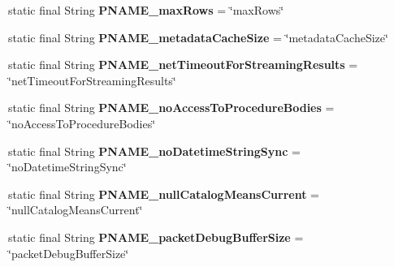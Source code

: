 \begin{DoxyCompactItemize}
\item 
\mbox{\label{classcom_1_1mysql_1_1cj_1_1conf_1_1_property_definitions_a490f08f3dee8039a62123c57b64488b5}} 
static final String {\bfseries P\+N\+A\+M\+E\+\_\+max\+Rows} = \char`\"{}max\+Rows\char`\"{}
\item 
\mbox{\label{classcom_1_1mysql_1_1cj_1_1conf_1_1_property_definitions_a5113a5969f5ac60dffa06189e5e741d9}} 
static final String {\bfseries P\+N\+A\+M\+E\+\_\+metadata\+Cache\+Size} = \char`\"{}metadata\+Cache\+Size\char`\"{}
\item 
\mbox{\label{classcom_1_1mysql_1_1cj_1_1conf_1_1_property_definitions_a6e3ce12814920666c6e75dcf8c844544}} 
static final String {\bfseries P\+N\+A\+M\+E\+\_\+net\+Timeout\+For\+Streaming\+Results} = \char`\"{}net\+Timeout\+For\+Streaming\+Results\char`\"{}
\item 
\mbox{\label{classcom_1_1mysql_1_1cj_1_1conf_1_1_property_definitions_a4b15a5d4e30785901513b2cae7f7b25c}} 
static final String {\bfseries P\+N\+A\+M\+E\+\_\+no\+Access\+To\+Procedure\+Bodies} = \char`\"{}no\+Access\+To\+Procedure\+Bodies\char`\"{}
\item 
\mbox{\label{classcom_1_1mysql_1_1cj_1_1conf_1_1_property_definitions_a2e3187e5c08d67d411c2852bffdd2d44}} 
static final String {\bfseries P\+N\+A\+M\+E\+\_\+no\+Datetime\+String\+Sync} = \char`\"{}no\+Datetime\+String\+Sync\char`\"{}
\item 
\mbox{\label{classcom_1_1mysql_1_1cj_1_1conf_1_1_property_definitions_afb27e8fdd2247297cb2285ded249d52e}} 
static final String {\bfseries P\+N\+A\+M\+E\+\_\+null\+Catalog\+Means\+Current} = \char`\"{}null\+Catalog\+Means\+Current\char`\"{}
\item 
\mbox{\label{classcom_1_1mysql_1_1cj_1_1conf_1_1_property_definitions_ad7222e6c35b0eb5c7afd50b56c418e27}} 
static final String {\bfseries P\+N\+A\+M\+E\+\_\+packet\+Debug\+Buffer\+Size} = \char`\"{}packet\+Debug\+Buffer\+Size\char`\"{}

\end{DoxyCompactItemize}
